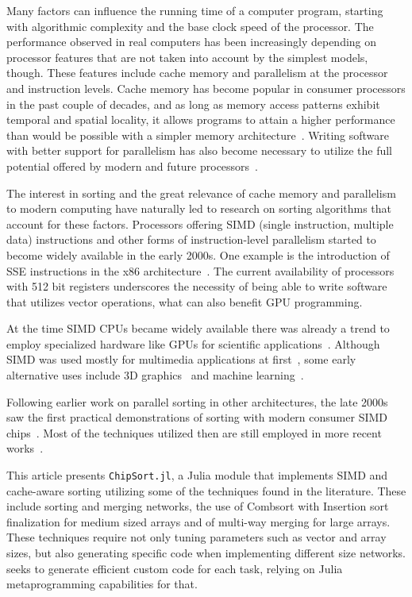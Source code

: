 \documentclass{juliacon}
\begin{document}
Many factors can influence the running time of a computer program, starting with algorithmic complexity and the base clock speed of the processor. The performance observed in real computers has been increasingly depending on processor features that are not taken into account by the simplest models, though. These features include cache memory and parallelism at the processor and instruction levels. Cache memory has become popular in consumer processors in the past couple of decades, and as long as memory access patterns exhibit temporal and spatial locality, it allows programs to attain a higher performance than would be possible with a simpler memory architecture~\cite[Chapter 3]{Drepper07whatevery}. Writing software with better support for parallelism has also become necessary to utilize the full potential offered by modern and future processors~\cite{wilson2018}.

The interest in sorting and the great relevance of cache memory and parallelism to modern computing have naturally led to research on sorting algorithms that account for these factors. Processors offering SIMD (single instruction, multiple data) instructions and other forms of instruction-level parallelism started to become widely available in the early 2000s. One example is the introduction of SSE instructions in the x86 architecture~\cite[Chapter 1]{kusswurm18}. The current availability of processors with 512 bit registers underscores the necessity of being able to write software that utilizes vector operations, what can also benefit GPU programming.

At the time SIMD CPUs became widely available there was already a trend to employ specialized hardware like GPUs for scientific applications~\cite{larsen2001fast,DBLP:conf/micro/ThompsonHO02}. Although SIMD was used mostly for multimedia applications at first~\cite{CHEN2006509,DBLP:journals/mam/SlingerlandS05}, some early alternative uses include 3D graphics~\cite{DBLP:conf/pcm/MaY02} and machine learning~\cite{DBLP:conf/europar/StreyB01}.

Following earlier work on parallel sorting in other architectures, the late 2000s saw the first practical demonstrations of sorting with modern consumer SIMD chips~\cite{DBLP:conf/IEEEpact/InoueMKN07,DBLP:journals/pvldb/ChhuganiNLMHCBKD08}. Most of the techniques utilized then are still employed in more recent works~\cite{DBLP:journals/pvldb/BalkesenATO13,DBLP:journals/pvldb/InoueT15}.

This article presents {\tt ChipSort.jl}, a Julia module that implements SIMD and cache-aware sorting utilizing some of the techniques found in the literature. These include sorting and merging networks, the use of Combsort with Insertion sort finalization for medium sized arrays and of multi-way merging for large arrays. These techniques require not only tuning parameters such as vector and array sizes, but also generating specific code when implementing different size networks. \chipsort seeks to generate efficient custom code for each task, relying on Julia metaprogramming capabilities for that.
\end{document}

